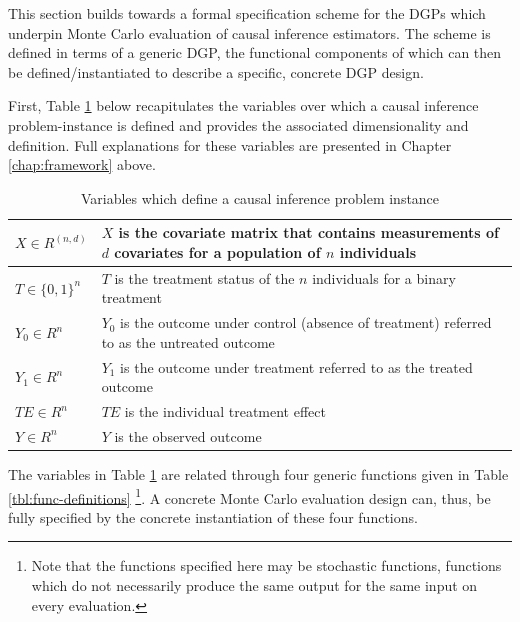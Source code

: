 \documentclass[../main.tex]{subfiles}
\begin{document}
This section builds towards a formal specification scheme for the DGPs which underpin Monte Carlo evaluation of causal inference estimators. The scheme is defined in terms of a generic DGP, the functional components of which can then be defined/instantiated to describe a specific, concrete DGP design.\par

\vspace{\baselineskip}

First, Table \ref{tbl:var-definitions} below recapitulates the variables over which a causal inference problem-instance is defined and provides the associated dimensionality and definition. Full explanations for these variables are presented in Chapter \ref{chap:framework} above.\par

\vspace{\baselineskip}

\begin{table}[H]
\begin{tabular}{|p{1in}|p{4in}|}
\hline

$X \in R^{ \left( n, d \right) }$ & $X$ is the covariate matrix that contains measurements of $d$ covariates for a population of $n$ individuals \\ \hline

$T \in \{0, 1\}^n$ & $T$ is the treatment status of the $n$ individuals for a binary treatment \\ \hline

$Y_0 \in R^n$ & $Y_0$ is the outcome under control (absence of treatment) referred to as the untreated outcome \\ \hline

$Y_1 \in R^n$ & $Y_1$ is the outcome under treatment referred to as the treated outcome \\ \hline

$TE \in R^n$ & $TE$ is the individual treatment effect \\ \hline

$Y \in R^n$ & $Y$ is the observed outcome \\ \hline
\end{tabular}

\caption{Variables which define a causal inference problem instance}
\label{tbl:var-definitions}
\end{table}

\vspace{\baselineskip}

The variables in Table \ref{tbl:var-definitions} are related through four generic functions given in Table \ref{tbl:func-definitions} \footnote{Note that the functions specified here may be stochastic functions, functions which do not necessarily produce the same output for the same input on every evaluation.}. A concrete Monte Carlo evaluation design can, thus, be fully specified by the concrete instantiation of these four functions.\par
\end{document}

